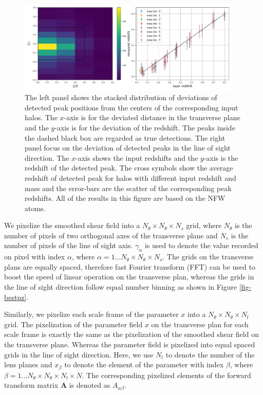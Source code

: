 \documentclass[twocolumn]{aastex62}
\begin{document}
\begin{figure}[!t]
 \centering
 \includegraphics[width=0.95\textwidth]{peak_scatters_f3-1.pdf}
 \caption{The left panel shows the stacked distribution of deviations of detected peak positions
 from the centers of the corresponding input halos. The $x$-axis is for the deviated distance in the transverse plane and the
 $y$-axis is for the deviation of the redshift. The peaks inside the dashed black box are regarded as true detections. The
 right panel focus on the deviation of detected peaks in the line of sight direction. The $x$-axis shows the input redshifts
 and the $y$-axis is the redshift of the detected peak. The cross symbols show the average redshift of detected peak for
 halos with different input redshift and mass and the error-bars are the scatter of the corresponding peak redshifts. All
 of the results in this figure are based on the NFW atoms.}
\end{figure}

We pixelize the smoothed shear field into a $N_\theta \times N_\theta \times N_s$ grid, where $N_\theta$
is the number of pixels of two orthogonal axes of the transverse plane and $N_s$ is the number of pixels of the
line of sight axis. $\gamma_{\alpha}$ is used to denote the value recorded on pixel with index $\alpha$, where $\alpha=
1...N_\theta \times N_\theta \times N_s$. The grids on the transverse plans are equally spaced, therefore fast Fourier
transform (FFT) can be used to boost the speed of linear operation on the transverse plan, whereas the grids in the
line of sight direction follow equal number binning as shown in Figure \ref{fig-bestpz}.

Similarly, we pixelize each scale frame of the parameter $x$ into a $N_\theta \times N_\theta \times N_l$ grid.
The pixelization of the parameter field $x$ on the transverse plan for each scale frame is exactly the same as the
pixelization of the smoothed shear field on the transverse plane. Whereas the parameter field is pixelized into equal
spaced grids in the line of sight direction. Here, we use $N_l$ to denote the number of the lens planes and $x_{\beta}$ to
denote the element of the parameter with index $\beta$, where $\beta=1...N_\theta \times N_\theta \times N_l \times N$.
The corresponding pixelized elements of the forward transform matrix $\mathbf{A}$ is denoted as $A_{\alpha\beta}$.
\end{document}
